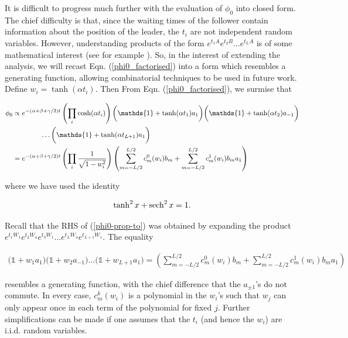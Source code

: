 It is difficult to progress much further with the evaluation of $\phi_0$ into closed form. The chief difficulty is that, since the waiting times of the follower contain information about the position of the leader, the $t_i$ are not independent random variables. However, understanding products of the form $e^{t_1A}e^{t_2B}\ldots e^{t_LA}$ is of some mathematical interest (see for example \cite{friedland1994product, cohen1982eigenvalue}). So, in the interest of extending the analysis, we will recast Eqn. (\ref{phi0_factorised}) into a form which resembles a generating function, allowing combinatorial techniques to be used in future work. Define  $w_i = \tanh(\alpha t_i)$. Then From Eqn. (\ref{phi0_factorised}), we surmise that 

\begin{align}\label{phi0-prop-to}\small
\phi_0 &\propto e^{-(\alpha + \beta +\gamma/2)t}\left (\prod_i \cosh(\alpha t_i) \right)\bigg( \mathds{1} + \tanh(\alpha t_1) a_1\bigg)\bigg( \mathds{1} + \tanh(\alpha t_2) a_{-1}\bigg)\nonumber\\ &\quad \quad \quad \quad\ldots\bigg(\mathds{1} + \tanh(\alpha t_{L+1})a_1\bigg) \\ 
&= e^{-(\alpha + \beta +\gamma/2)t}\left(\prod_i \frac{1}{\sqrt{1-w_i^2}} \right)\left(\sum_{m = -L/2}^{L/2}c^0_m(w_i)b_m + \sum_{m = -L/2}^{L/2}c^1_m(w_i)b_ma_1\right)
\end{align}

where we have used the identity 

\begin{align}
\tanh^2 x + \sech^2 x = 1.
\end{align}

Recall that the RHS of (\ref{phi0-prop-to}) was obtained by expanding the product $e^{t_1 W_1}e^{t_2 W_4}e^{t_3 W_1}\ldots e^{t_L W_4}e^{t_{L+1} W_1}$. The equality 

\begin{align}\label{generating-function}
\bigg( \mathds{1} + w_1 a_1\bigg)\bigg( \mathds{1} + w_2 a_{-1}\bigg)\ldots\bigg(\mathds{1} + w_{L+1}a_1\bigg) =\left(\sum_{m = -L/2}^{L/2}c^0_m(w_i)b_m + \sum_{m = -L/2}^{L/2}c^1_m(w_i)b_ma_1\right)\label{generating-function}
\end{align}


resembles a generating function, with the chief difference that the $a_{\pm1}$'s do not commute. In every case, $c_m^k(w_i)$ is a polynomial in the $w_i$'s such that $w_j$ can only appear once in each term of the polynomial for fixed $j$. Further simplifications can be made if one assumes that the $t_i$ (and hence the $w_i$) are i.i.d. random variables. 

